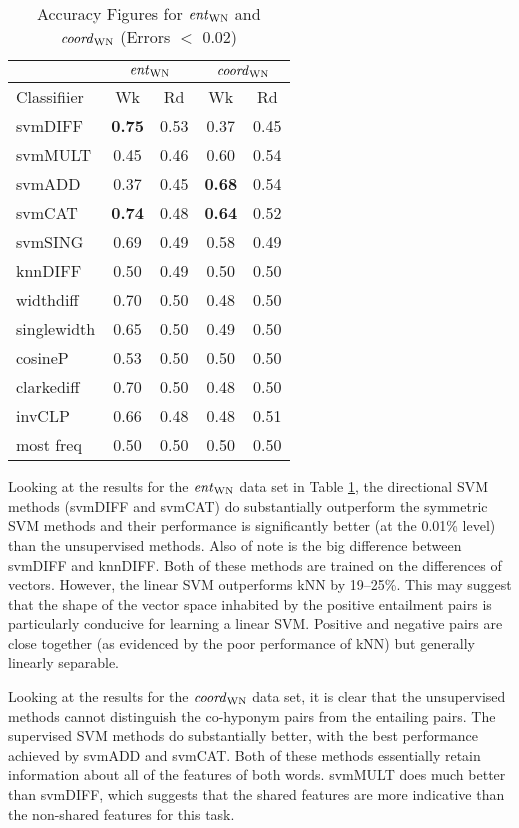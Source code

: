 \documentclass[11pt]{article}
\newcommand\entWN{\mbox{\em ent\/}_{\mbox{\scriptsize WN}}}
\newcommand\coordWN{\mbox{\em coord\/}_{\mbox{\scriptsize WN}}}
\begin{document}
\begin{table}[ht]
\centering
\begin{tabular}{|l|c|c|c|c|}
\hline
&\multicolumn{2}{|c|}{$\entWN$}&\multicolumn{2}{|c|}{$\coordWN$}\\
\hline
Classifiier&Wk&Rd&Wk&Rd\\
\hline
svmDIFF&\textbf{0.75}&0.53&0.37&0.45\\
svmMULT&0.45&0.46&0.60&0.54\\
svmADD&0.37&0.45&\textbf{0.68}&0.54\\
svmCAT&\textbf{0.74}&0.48&\textbf{0.64}&0.52\\
svmSING&0.69&0.49&0.58&0.49\\
knnDIFF&0.50&0.49&0.50&0.50\\
\hline
widthdiff&0.70&0.50&0.48&0.50\\
singlewidth&0.65&0.50&0.49&0.50\\
cosineP&0.53&0.50&0.50&0.50\\
clarkediff&0.70&0.50&0.48&0.50\\
invCLP&0.66&0.48&0.48&0.51\\
most freq&0.50&0.50&0.50&0.50\\
\hline
\end{tabular}
\caption{Accuracy Figures for $\entWN$ and $\coordWN$ (Errors $<$ 0.02)}
\label{table:results_WN}
\end{table}

Looking at the results for the $\entWN$ data set in Table \ref{table:results_WN}, the directional SVM methods (svmDIFF and svmCAT) do substantially outperform the symmetric SVM methods and their performance is significantly better (at the 0.01\% level) than the unsupervised methods.  Also of note is the big difference between svmDIFF and knnDIFF.  Both of these methods are trained on the differences of vectors.  However, the linear SVM outperforms kNN by 19--25\%.  This may suggest that the shape of the vector space inhabited by the positive entailment pairs is particularly conducive for learning a linear SVM.  Positive and negative pairs are close together (as evidenced by the poor performance of kNN) but generally linearly separable.

Looking at the results for the $\coordWN$ data set, it is clear that the unsupervised methods cannot distinguish the co-hyponym pairs from the entailing pairs.  The supervised SVM methods do substantially better, with the best performance achieved by svmADD and svmCAT.  Both of these methods essentially retain information about all of the features of both words.  svmMULT does much better than svmDIFF, which suggests that the shared features are more indicative than the non-shared features for this task. 
\end{document}
